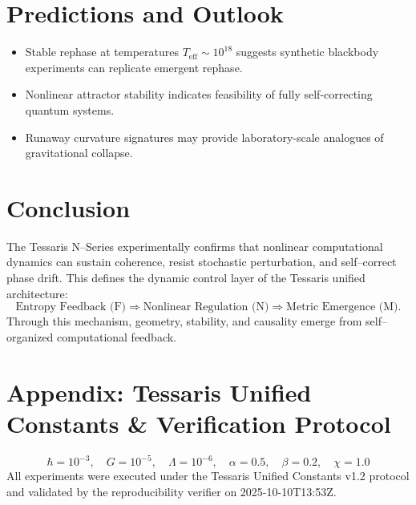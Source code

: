 \documentclass[11pt,a4paper]{article}
\begin{document}
\section{Predictions and Outlook}
\begin{itemize}
\item Stable rephase at temperatures \(T_{\text{eff}}\sim10^{18}\) suggests synthetic blackbody experiments can replicate emergent rephase.
\item Nonlinear attractor stability indicates feasibility of fully self-correcting quantum systems.
\item Runaway curvature signatures may provide laboratory-scale analogues of gravitational collapse.
\end{itemize}

\section{Conclusion}
The Tessaris N--Series experimentally confirms that nonlinear computational dynamics can sustain coherence, resist stochastic perturbation, and self--correct phase drift.
This defines the dynamic control layer of the Tessaris unified architecture:
\[
\text{Entropy Feedback (F)} \Rightarrow
\text{Nonlinear Regulation (N)} \Rightarrow
\text{Metric Emergence (M)}.
\]
Through this mechanism, geometry, stability, and causality emerge from self--organized computational feedback.

\section*{Appendix: Tessaris Unified Constants \& Verification Protocol}
\[
\hbar{=}10^{-3},\quad
G{=}10^{-5},\quad
\Lambda{=}10^{-6},\quad
\alpha{=}0.5,\quad
\beta{=}0.2,\quad
\chi{=}1.0
\]
All experiments were executed under the Tessaris Unified Constants v1.2 protocol and validated by the reproducibility verifier on 2025-10-10T13:53Z.
\end{document}
